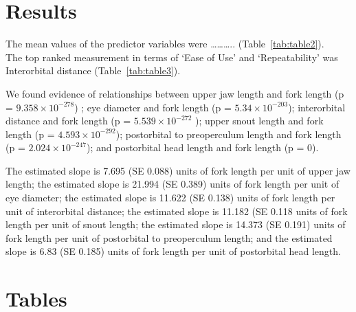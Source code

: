 \documentclass[12pt]{article}\usepackage[]{graphicx}\usepackage[]{color}
\begin{document}
\hypertarget{results}{%
\section{Results}\label{results}}

The mean values of the predictor variables were \ldots\ldots\ldots.. (Table~\ref{tab:table2}).\\
The top ranked measurement in terms of `Ease of Use' and `Repeatability' was Interorbital distance (Table~\ref{tab:table3}).

We found evidence of relationships between upper jaw length and fork length (p = \ensuremath{9.358\times 10^{-278}}) ; eye diameter and fork length (p = \ensuremath{5.34\times 10^{-203}}); interorbital distance and fork length (p = \ensuremath{5.539\times 10^{-272}} ); upper snout length and fork length (p = \ensuremath{4.593\times 10^{-292}}); postorbital to preoperculum length and fork length (p = \ensuremath{2.024\times 10^{-247}}); and postorbital head length and fork length (p = 0).

The estimated slope is 7.695 (SE 0.088) units of fork length per unit of upper jaw length; the estimated slope is 21.994 (SE 0.389) units of fork length per unit of eye diameter; the estimated slope is 11.622 (SE 0.138) units of fork length per unit of interorbital distance; the estimated slope is 11.182 (SE 0.118 units of fork length per unit of snout length; the estimated slope is 14.373 (SE 0.191) units of fork length per unit of postorbital to preoperculum length; and the estimated slope is 6.83 (SE 0.185) units of fork length per unit of postorbital head length.

\hypertarget{tables}{%
\section{Tables}\label{tables}}
\end{document}
